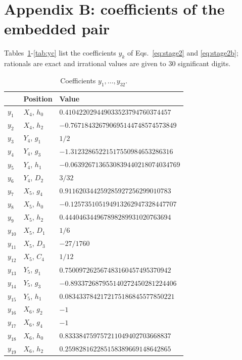 \documentclass[12pt]{article}
\begin{document}
\section*{Appendix B: coefficients of the embedded pair}

\noindent Tables~\ref{tab:ya}-\ref{tab:yc} list the coefficients $y_k$ of Eqs.~\ref{eq:stage2} and \ref{eq:stage2b}; rationals are exact and irrational values are given to 30 significant digits.

\begin{table}[H]
\centering\small
\caption{Coefficients $y_1,\ldots,y_{32}$.}\label{tab:ya}
\begin{tabular}{lll}
\hline
 & Position & Value \\ \hline
$y_{1}$ & $X_{4}$, $h_{0}$ & $0.410422029449033523794760374457$ \\
$y_{2}$ & $X_{4}$, $h_{2}$ & $-0.767184326790695144748574573849$ \\
$y_{3}$ & $Y_{4}$, $g_{1}$ & $1/2$ \\
$y_{4}$ & $Y_{4}$, $g_{3}$ & $-1.31232865221517550984653286316$ \\
$y_{5}$ & $Y_{4}$, $h_{1}$ & $-0.0639267136530839440218074034769$ \\
$y_{6}$ & $Y_{4}$, $D_{2}$ & $3/32$ \\
$y_{7}$ & $X_{5}$, $g_{4}$ & $0.911620344259285927256299010783$ \\
$y_{8}$ & $X_{5}$, $h_{0}$ & $-0.125735105194913262947328447707$ \\
$y_{9}$ & $X_{5}$, $h_{2}$ & $0.444046344967898289931020763694$ \\
$y_{10}$ & $X_{5}$, $D_{1}$ & $1/6$ \\
$y_{11}$ & $X_{5}$, $D_{3}$ & $-27/1760$ \\
$y_{12}$ & $X_{5}$, $C_{4}$ & $1/12$ \\
$y_{13}$ & $Y_{5}$, $g_{1}$ & $0.750097262567483160457495370942$ \\
$y_{14}$ & $Y_{5}$, $g_{3}$ & $-0.893372687955140272450281224406$ \\
$y_{15}$ & $Y_{5}$, $h_{1}$ & $0.0834337842172175186845577850221$ \\
$y_{16}$ & $X_{6}$, $g_{2}$ & $-1$ \\
$y_{17}$ & $X_{6}$, $g_{4}$ & $-1$ \\
$y_{18}$ & $X_{6}$, $h_{0}$ & $0.833384759757211049402703668837$ \\
$y_{19}$ & $X_{6}$, $h_{2}$ & $0.259828162285158389669148642865$ \\

\end{tabular}
\end{table}
\end{document}
